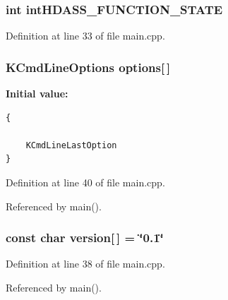 \subsubsection{\setlength{\rightskip}{0pt plus 5cm}int {\bf int\-HDASS\_\-FUNCTION\_\-STATE}}\label{main_8cpp_a0}




Definition at line 33 of file main.cpp.
\subsubsection{\setlength{\rightskip}{0pt plus 5cm}KCmd\-Line\-Options {\bf options}[$\,$]\hspace{0.3cm}{\tt  [static]}}\label{main_8cpp_a4}


{\bf Initial value:}

\footnotesize\begin{verbatim}
{

    KCmdLineLastOption
}
\end{verbatim}\normalsize 


Definition at line 40 of file main.cpp.

Referenced by main().
\subsubsection{\setlength{\rightskip}{0pt plus 5cm}const char {\bf version}[$\,$] = \char`\"{}0.1\char`\"{}\hspace{0.3cm}{\tt  [static]}}\label{main_8cpp_a3}




Definition at line 38 of file main.cpp.

Referenced by main().